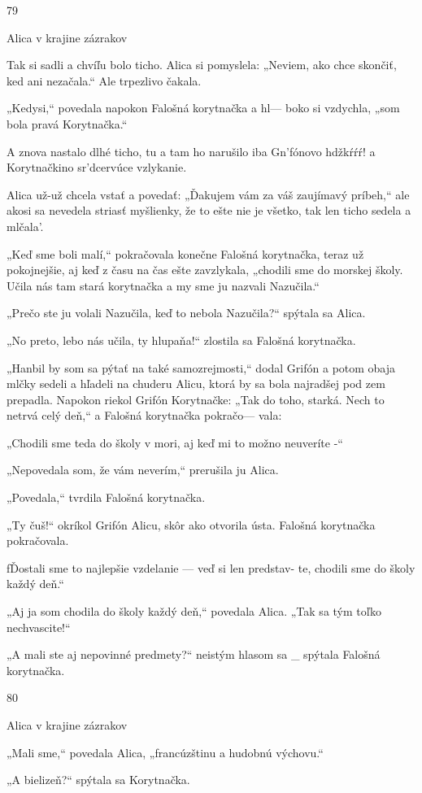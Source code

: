 \documentclass[12pt]{article}
\begin{document}
\begin{Parallel}[p]{}{}
{{79

Alica v krajine zázrakov

Tak si sadli a chvíľu bolo ticho. Alica si pomyslela:
„Neviem, ako chce skončiť, ked ani nezačala.“ Ale trpezlivo
čakala.

„Kedysi,“ povedala napokon Falošná korytnačka a hl—
boko si vzdychla, „som bola pravá Korytnačka.“

A znova nastalo dlhé ticho, tu a tam ho narušilo iba
Gn'fónovo hdžkŕŕŕ! a Korytnačkino sr'dcervúce vzlykanie.

Alica už-už chcela vstať a povedať: „Ďakujem vám za váš
zaujímavý príbeh,“ ale akosi sa nevedela striasť myšlienky,
že to ešte nie je všetko, tak len ticho sedela a mlčala'.

„Keď sme boli malí,“ pokračovala konečne Falošná
korytnačka, teraz už pokojnejšie, aj keď z času na čas ešte
zavzlykala, „chodili sme do morskej školy. Učila nás tam
stará korytnačka a my sme ju nazvali Nazučila.“

„Prečo ste ju volali Nazučila, keď to nebola Nazučila?“
spýtala sa Alica.

„No preto, lebo nás učila, ty hlupaňa!“ zlostila sa Falošná
korytnačka.

„Hanbil by som sa pýtať na také samozrejmosti,“ dodal
Grifón a potom obaja mlčky sedeli a hľadeli na chuderu
Alicu, ktorá by sa bola najradšej pod zem prepadla.
Napokon riekol Grifón Korytnačke: „Tak do toho, starká.
Nech to netrvá celý deň,“ a Falošná korytnačka pokračo—
vala:

„Chodili sme teda do školy v mori, aj keď mi to možno
neuveríte -“

„Nepovedala som, že vám neverím,“ prerušila ju Alica.

„Povedala,“ tvrdila Falošná korytnačka.

„Ty čuš!“ okríkol Grifón Alicu, skôr ako otvorila ústa.
Falošná korytnačka pokračovala.

fĎostali sme to najlepšie vzdelanie — veď si len predstav-
te, chodili sme do školy každý deň.“

„Aj ja som chodila do školy každý deň,“ povedala Alica.
„Tak sa tým toľko nechvascite!“

„A mali ste aj nepovinné predmety?“ neistým hlasom sa _
spýtala Falošná korytnačka.

80

Alica v krajine zázrakov

„Mali sme,“ povedala Alica, „francúzštinu a hudobnú
výchovu.“

„A bielizeň?“ spýtala sa Korytnačka.

}}
\end{Parallel}
\end{document}
